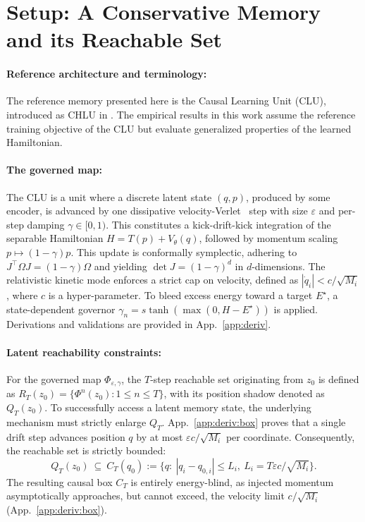 \documentclass{article}
\newcommand{\detJ}{\det J}
\begin{document}
\section{Setup: A Conservative Memory and its Reachable Set}
\paragraph{Reference architecture and terminology:}
The reference memory presented here is the Causal Learning Unit (CLU), introduced as CHLU in \citet{jawahar_chlu_2026}. The empirical results in this work assume the reference training objective of the CLU but evaluate generalized properties of the learned Hamiltonian.

\paragraph{The governed map:}
The CLU is a unit where a discrete latent state $(q,p)$, produced by some encoder, is advanced by one dissipative velocity-Verlet~\citep{martys1999velocity} step with size $\varepsilon$ and per-step damping $\gamma\in[0,1)$. This constitutes a kick-drift-kick integration of the separable Hamiltonian $H=T(p)+V_\theta(q)$, followed by momentum scaling $p\mapsto(1-\gamma)p$. This update is conformally symplectic, adhering to $J^\top\Omega J=(1-\gamma)\Omega$ and yielding $\detJ=(1-\gamma)^d$ in $d$-dimensions. The relativistic kinetic mode enforces a strict cap on velocity, defined as $|\dot q_i|<c/\sqrt{M_i}$, where $c$ is a hyper-parameter. To bleed excess energy toward a target $E^\star$, a state-dependent governor $\gamma_n=s\tanh(\max(0,H-E^\star))$ is applied. Derivations and validations are provided in App.~\ref{app:deriv}.

\paragraph{Latent reachability constraints:}
For the governed map $\Phi_{\varepsilon,\gamma}$, the $T$-step reachable set originating from $z_0$ is defined as $R_T(z_0)=\{\Phi^n(z_0):1\le n\le T\}$, with its position shadow denoted as $Q_T(z_0)$. To successfully access a latent memory state, the underlying mechanism must strictly enlarge $Q_T$. App.~\ref{app:deriv:box} proves that a single drift step advances position $q$ by at most $\varepsilon c/\sqrt{M_i}$ per coordinate. Consequently, the reachable set is strictly bounded:
\[
Q_T(z_0)\ \subseteq\ C_T(q_0):=\{q:\ |q_i-q_{0,i}|\le L_i,\ L_i=T\varepsilon c/\sqrt{M_i}\}.
\]
The resulting causal box $C_T$ is entirely energy-blind, as injected momentum asymptotically approaches, but cannot exceed, the velocity limit $c/\sqrt{M_i}$ (App.~\ref{app:deriv:box}).
\end{document}
